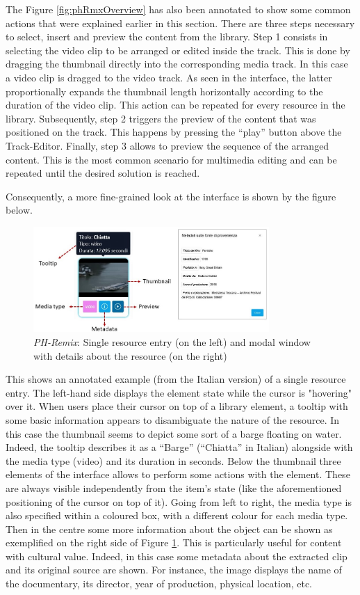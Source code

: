 The Figure \ref{fig:phRmxOverview} has also been annotated to show some common actions that were explained earlier in this section. There are three steps necessary to select, insert and preview the content from the library. Step 1 consists in selecting the video clip to be arranged or edited inside the track. This is done by dragging the thumbnail directly into the corresponding media track. In this case a video clip is dragged to the video track. As seen in the interface, the latter proportionally expands the thumbnail length horizontally according to the duration of the video clip. This action can be repeated for every resource in the library. Subsequently, step 2 triggers the preview of the content that was positioned on the track. This happens by pressing the “play” button above the Track-Editor. Finally, step 3 allows to preview the sequence of the arranged content. This is the most common scenario for multimedia editing and can be repeated until the desired solution is reached.

Consequently, a more fine-grained look at the interface is shown by the figure below.

\begin{figure}[H]
\centering
\includegraphics[width=0.8\textwidth]{images/phrDetails.jpg}
\caption{\emph{PH-Remix}: Single resource entry (on the left) and modal window with details about the resource (on the right)}
\label{fig:phRmxDetails}
\end{figure}

This shows an annotated example (from the Italian version) of a single resource entry. The left-hand side displays the element state while the cursor is "hovering" over it. When users place their cursor on top of a library element, a tooltip with some basic information appears to disambiguate the nature of the resource. In this case the thumbnail seems to depict some sort of a barge floating on water. Indeed, the tooltip describes it as a “Barge” (“Chiatta” in Italian) alongside with the media type (video) and its duration in seconds. Below the thumbnail three elements of the interface allows to perform some actions with the element. These are always visible independently from the item’s state (like the aforementioned positioning of the cursor on top of it). Going from left to right, the media type is also specified within a coloured box, with a different colour for each media type. Then in the centre some more information about the object can be shown as exemplified on the right side of Figure \ref{fig:phRmxDetails}. This is particularly useful for content with cultural value. Indeed, in this case some metadata about the extracted clip and its original source are shown. For instance, the image displays the name of the documentary, its director, year of production, physical location, etc.

